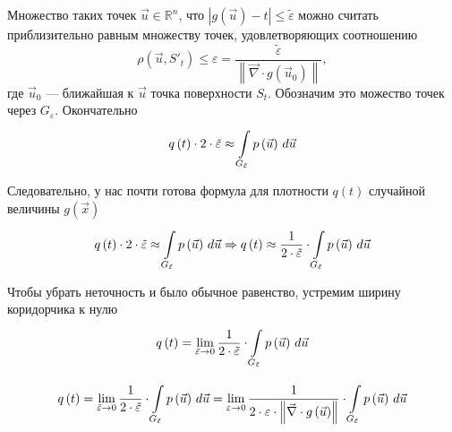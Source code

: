 Множество таких точек $\vec{u} \in \mathbb{R}^n$, что
$\left| g\left( \vec{u} \right) - t \right| \le \tilde{\varepsilon}$
можно считать приблизительно равным множеству точек, удовлетворяющих
соотношению
\begin{equation}\label{widthEpsilon}
  \rho\left( \vec{u}, S'_t \right) \le \varepsilon
  = \frac{\tilde{\varepsilon}}
    {\left\| \vec{\nabla} \cdot g\left( \vec{u}_0 \right) \right\|},
\end{equation}
где $\vec{u}_0$ --- ближайшая к $\vec{u}$ точка поверхности $S_t$.
Обозначим это можество точек через $G_{\varepsilon}$.
Окончательно
\begin{equation*}
  q\left( t \right) \cdot 2 \cdot \tilde{\varepsilon}
  \approx \integrall{G_{\tilde{\varepsilon}}}{d\vec{u}}{\pdf{\vec{u}}}
\end{equation*}

Следовательно, у нас почти готова формула для плотности $q\left( t \right)$
случайной величины $g\left( \vec{x} \right)$
$$q\left( t \right) \cdot 2 \cdot \tilde{\varepsilon}
      \approx \integrall{G_{\tilde{\varepsilon}}}{d\vec{u}}{\pdf{\vec{u}}}
      \Rightarrow q\left( t \right)
      \approx \frac{1}{2 \cdot \tilde{\varepsilon}}
      \cdot \integrall{G_{\tilde{\varepsilon}}}{d\vec{u}}{
    \pdf{\vec{u}}}$$

Чтобы убрать неточность и было обычное равенство,
устремим ширину коридорчика к нулю
\begin{equation}\label{isosurfaceDencity}
  q\left( t \right)
      = \lim_{\tilde{\varepsilon} \to 0} \frac{1}{2 \cdot \tilde{\varepsilon}}
      \cdot \integrall{G_{\tilde{\varepsilon}}}{d\vec{u}}{\pdf{\vec{u}}}
\end{equation}

\begin{comment}
Распишем $\tilde{\varepsilon}$, воспользовавшись формулой \eqref{widthEpsilon}
$$\varepsilon
  \approx \frac{\tilde{\varepsilon}}
      {\left\| \vec{\nabla} \cdot {g\left( \vec{u} \right)} \right\|}
  \Rightarrow
      \tilde{\varepsilon} \approx \varepsilon
      \cdot \left\| \vec{\nabla} \cdot g\left( \vec{u} \right) \right\|$$

Вернёмся к плотности в формуле \eqref{isosurfaceDencity}.
Заменив $\tilde{\varepsilon}$ на $\varepsilon
\cdot \left\| \vec{\nabla} \cdot g\left( \vec{u} \right) \right\|$,
нужно разобраться, что теперь нужно устремлять к нулю.
Поскольку модуль градиента --- величина, зависящая от координат,
и стремиться к нулю будет лишь при изменении поведения функции,
то устремлять будем $\varepsilon$ (толщину кокона)
\end{comment}
$$q\left( t \right)
      = \lim_{\tilde{\varepsilon} \to 0} \frac{1}{2 \cdot \tilde{\varepsilon}}
      \cdot \integrall{G_{\tilde{\varepsilon}}}{d\vec{u}}{\pdf{\vec{u}}}
      = \lim_{\varepsilon \to 0} \frac{1}{2 \cdot \varepsilon
      \cdot \left\| \vec{\nabla} \cdot g\left( \vec{u} \right) \right\|}
      \cdot \integrall{G_{\tilde{\varepsilon}}}{d\vec{u}}{\pdf{\vec{u}}}$$

